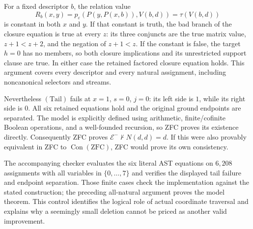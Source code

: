 For a fixed descriptor $b$, the relation value
\[
 R_b(x,y)=p_\varepsilon(P(y,P(x,b)),V(b,d))
          =\tau(V(b,d))
\]
is constant in both $x$ and $y$. If that constant is truth, the bad branch
of the closure equation is true at every $z$: its three conjuncts are
the true matrix value, $z+1<z+2$, and the negation of $z+1<z$.
If the constant is false, the target $h=0$ has no members, so both closure
implications and its unrestricted support clause are true. In either
case the retained factored closure equation holds. This argument covers
every descriptor and every natural assignment, including noncanonical
selectors and streams.

Nevertheless $(\mathrm{Tail})$ fails at $x=1$, $s=0$, $j=0$: its left
side is $1$, while its right side is $0$. All six retained equations hold
and the original ground endpoints are separated. The model is explicitly
defined using arithmetic, finite/cofinite Boolean operations, and a
well-founded recursion, so ZFC proves its existence directly. Consequently
ZFC proves $\mathcal E^-\not\vdash N(d,d)=d$. If this were also provably
equivalent in ZFC to $\operatorname{Con}(\mathrm{ZFC})$, ZFC would prove
its own consistency.

The accompanying checker evaluates the six literal AST equations on
$6{,}208$ assignments with all variables in $\{0,\ldots,7\}$ and verifies
the displayed tail failure and endpoint separation. Those finite cases
check the implementation against the stated construction; the preceding
all-natural argument proves the model theorem. This control identifies
the logical role of actual coordinate traversal and explains why a
seemingly small deletion cannot be priced as another valid improvement.
